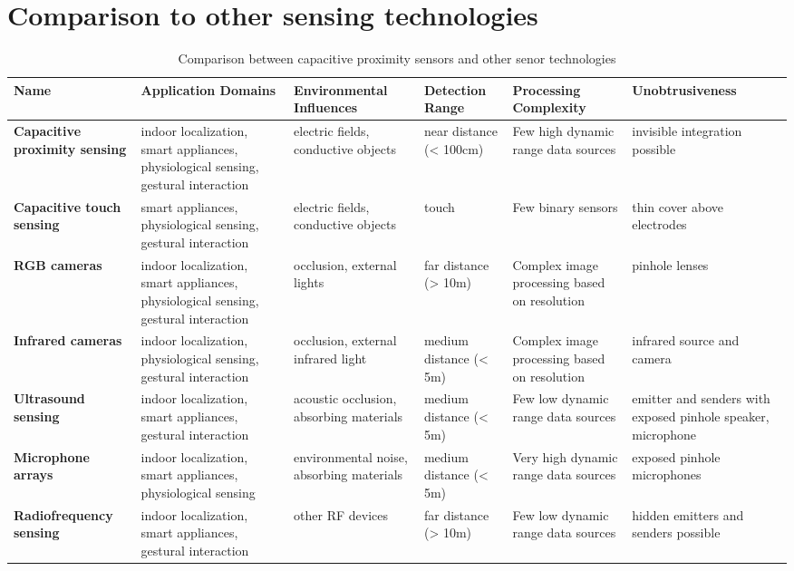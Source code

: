 \section{Comparison to other sensing technologies}

\begin{table}[htbp]
  \centering
  \footnotesize
  \caption{Comparison between capacitive proximity sensors and other senor technologies}
    \begin{tabularx}{\linewidth}{Xp{4cm}XXXX}
    \toprule
    \textbf{Name} & \textbf{Application Domains} & \textbf{Environmental Influences} & \textbf{Detection Range} & \textbf{Processing Complexity} & \textbf{Unobtrusiveness} \\
    \midrule
    \textbf{Capacitive proximity sensing} & indoor localization, smart appliances, physiological sensing, gestural interaction & electric fields, conductive objects & near distance   (< 100cm) & Few high dynamic range data sources  & invisible integration possible \\ \addlinespace
    \textbf{Capacitive touch sensing} & smart appliances, physiological sensing, gestural interaction & electric fields, conductive objects & touch  & Few binary sensors & thin cover above electrodes \\ \addlinespace
    \textbf{RGB cameras } & indoor localization, smart appliances, physiological sensing, gestural interaction & occlusion, external lights & far distance     (> 10m) & Complex image processing based on resolution & pinhole lenses \\ \addlinespace
    \textbf{Infrared cameras} & indoor localization, physiological sensing, gestural interaction & occlusion, external infrared light & medium distance (< 5m) & Complex image processing based on resolution & infrared source and camera \\ \addlinespace
    \textbf{Ultrasound sensing} & indoor localization, smart appliances, gestural interaction & acoustic occlusion, absorbing materials & medium distance (< 5m) & Few low dynamic range data sources & emitter and senders with exposed pinhole speaker, microphone \\ \addlinespace
    \textbf{Microphone arrays} & indoor localization, smart appliances, physiological sensing & environmental noise, absorbing materials & medium distance (< 5m) & Very high dynamic range data sources & exposed pinhole microphones \\ \addlinespace
    \textbf{Radiofrequency sensing} & indoor localization, smart appliances, gestural interaction & other RF devices & far distance     (> 10m) & Few low dynamic range data sources & hidden emitters and senders possible \\
    \bottomrule
    \end{tabularx}%
  \label{tab:addlabel}%
\end{table}%



